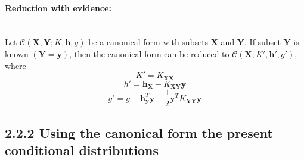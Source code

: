 \documentclass[12pt,oneside,openany,a4paper, %
afrikaans,english,
]{memoir}
\numberwithin{equation}{chapter}
\begin{document}
\paragraph{Reduction with evidence:}\mbox{}\\
Let $\mathcal{C}(\bm{X},\bm{Y};K,\bm{h},g)$ be a canonical form with subsets $\bm{X}$ and $\bm{Y}$. If subset $\bm{Y}$ is known $(\bm{Y} =  \bm{y})$, then the canonical form can be reduced to $\mathcal{C}(\bm{X}; K',\bm{h}',g')$, where
\begin{equation}
K' = K_{\bm{XX}}
\end{equation}
\begin{equation}
h' = \bm{h}_{\bm{X}} - K_{\bm{XY}}\bm{y}
\end{equation}
\begin{equation}
g' = g + \bm{h}_{\bm{y}}^T\bm{y} - \frac{1}{2}\bm{y}^TK_{\bm{YY}}\bm{y}
\end{equation}

\subsection{2.2.2 Using the canonical form the present conditional distributions}
\end{document}
